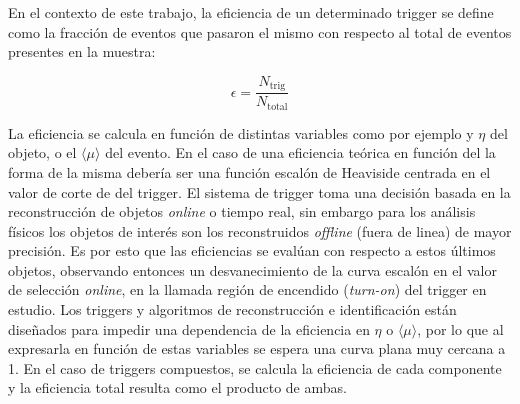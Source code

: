 En el contexto de este trabajo, la eficiencia de un determinado trigger se define como la fracción de eventos que pasaron el mismo con respecto al total de eventos presentes en la muestra:

\begin{equation}
	\epsilon = \frac{N_\text{trig}}{N_\text{total}}
\end{equation}

La eficiencia se calcula en función de distintas variables como por ejemplo \pt y $\eta$ del objeto, o el $\langle\mu\rangle$ del evento. En el caso de una eficiencia teórica en función del \pt la forma de la misma debería ser una función escalón de Heaviside centrada en el valor de corte de \pt del trigger. El sistema de trigger toma una decisión basada en la reconstrucción de objetos \textit{online} o tiempo real, sin embargo para los análisis físicos los objetos de interés son los reconstruidos \textit{offline} (fuera de linea) de mayor precisión. Es por esto que las eficiencias se evalúan con respecto a estos últimos objetos, observando entonces un desvanecimiento de la curva escalón en el valor de selección \textit{online}, en la llamada región de encendido (\textit{turn-on}) del trigger en estudio. 
Los triggers y algoritmos de reconstrucción e identificación están diseñados para impedir una dependencia de la eficiencia en $\eta$ o $\langle\mu\rangle$, por lo que al expresarla en función de estas variables se espera una curva plana muy cercana a 1. En el caso de triggers compuestos, se calcula la eficiencia de cada componente y la eficiencia total resulta como el producto de ambas.

